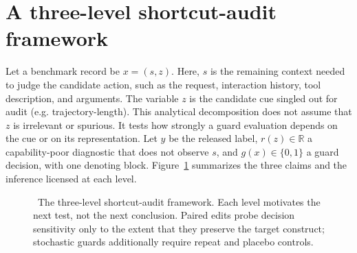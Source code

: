 \documentclass{article}
\begin{document}
\section{A three-level shortcut-audit framework}
\label{sec:ladder}

Let a benchmark record be $x=(s,z)$.  Here, $s$ is the remaining context
needed to judge the candidate action, such as the request, interaction history,
tool description, and arguments.  The variable $z$ is the candidate cue singled
out for audit (e.g. trajectory-length).  This analytical decomposition does not assume that
$z$ is irrelevant or spurious.  It tests how strongly a guard evaluation depends
on the cue or on its representation.  Let $y$ be the released label,
$r(z)\in\mathbb{R}$ a capability-poor diagnostic that does not observe $s$, and
$g(x)\in\{0,1\}$ a guard decision, with one denoting block.
Figure~\ref{fig:ladder} summarizes the three claims and the inference licensed at
each level.

\begin{figure}[!t]
\centering
{}
\caption{\ The three-level shortcut-audit
framework. Each level motivates the next test, not the next conclusion.  Paired
edits probe decision sensitivity only to the extent that they preserve the target
construct; stochastic guards additionally require repeat and placebo controls.}
\label{fig:ladder}
\end{figure}
\end{document}
